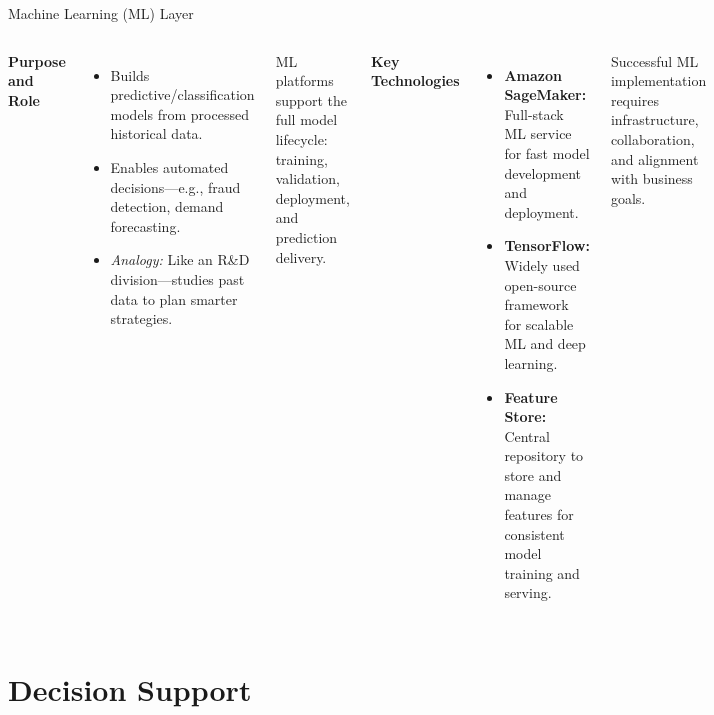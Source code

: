 \documentclass[aspectratio=169, table]{beamer}
\begin{document}
	\begin{frame}[fragile]{Machine Learning (ML) Layer}
		\vspace{20pt}
		\begin{columns}[T,onlytextwidth]
			\textbf{Purpose and Role}
			\begin{itemize}
				\item Builds predictive/classification models from processed historical data.
				\item Enables automated decisions—e.g., fraud detection, demand forecasting.
				\item \textit{Analogy:} Like an R\&D division—studies past data to plan smarter strategies.
			\end{itemize}
			ML platforms support the full model lifecycle: training, validation, deployment, and prediction delivery.
			
			\textbf{Key Technologies}
			\begin{itemize}
				\item \textbf{Amazon SageMaker:} Full-stack ML service for fast model development and deployment.
				\item \textbf{TensorFlow:} Widely used open-source framework for scalable ML and deep learning.
				\item \textbf{Feature Store:} Central repository to store and manage features for consistent model training and serving.
			\end{itemize}
			Successful ML implementation requires infrastructure, collaboration, and alignment with business goals.
		\end{columns}
	\end{frame}
	
	
	\section{Decision Support}
	
\end{document}
